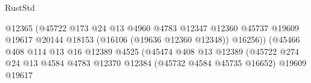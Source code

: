 \begin{lexlean}{RustStd}
\begin{coremodule}
                                                            @12365
                                                            (@45722
                                                              @173
                                                              @24
                                                              @13
                                                              @4960
                                                              @4783
                                                              @12347
                                                              @12360
                                                              @45737
                                                              @19609
                                                              @19617
                                                              @20144
                                                              @18153
                                                              (@16106 (@19636 @12360 @12348))
                                                              @16256))
                                                          (@45466
                                                            @408
                                                            @114
                                                            @13
                                                            @16
                                                            @12389
                                                            @4525
                                                            (@45474
                                                              @408
                                                              @13
                                                              @12389
                                                              (@45722
                                                                @274
                                                                @24
                                                                @13
                                                                @4584
                                                                @4783
                                                                @12370
                                                                @12384
                                                                (@45732 @4584 @45735 @16652)
                                                                @19609
                                                                @19617

\end{coremodule}
\end{lexlean}
